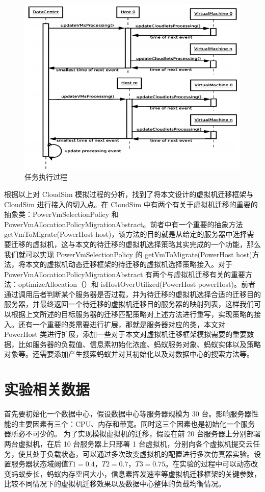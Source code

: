 \begin{figure}[htb]
  \centering
  \includegraphics{./Figure/IMG_Chap4_3.png}
  \caption{任务执行过程}\label{Fig:chap4_3}
\end{figure}

根据以上对 CloudSim 模拟过程的分析，找到了将本文设计的虚拟机迁移框架与 CloudSim 进行接入的切入点。在 CloudSim 中有两个有关于虚拟机迁移的重要的抽象类：PowerVmSelectionPolicy 和 PowerVmAllocationPolicyMigrationAbstract。前者中有一个重要的抽象方法 getVmToMigrate(PowerHost host)，该方法的目的就是从给定的服务器中选择需要迁移的虚拟机，这与本文的待迁移的虚拟机选择策略其实完成的一个功能，那么我们就可以实现 PowerVmSelectionPolicy 的 getVmToMigrate(PowerHost host)方法，将本文的虚拟机动态迁移框架的待迁移的虚拟机选择策略接入。对于 PowerVmAllocationPolicyMigrationAbstract 有两个与虚拟机迁移有关的重要方法：optimizeAllocation（）和 isHostOverUtilized(PowerHost powerHost)。前者通过调用后者判断某个服务器是否过载，并为待迁移的虚拟机选择合适的迁移目的服务器，并最终返回一个待迁移的虚拟机迁移目的服务器的映射列表，这样我们可以根据上文所述的目标服务器的迁移匹配策略对上述方法进行重写，实现策略的接入。还有一个重要的类需要进行扩展，那就是服务器对应的类，本文对 PowerHost 类进行扩展，添加一些对于本文对虚拟机迁移框架模拟需要的重要数据，比如服务器的负载值、信息素初始化浓度、蚂蚁服务对象、蚂蚁实体以及策略对象等。还需要添加产生搜索蚂蚁并对其初始化以及对数据中心的搜索方法等。

 \section{实验相关数据}
首先要初始化一个数据中心，假设数据中心等服务器规模为 30 台。影响服务器性能的主要因素有三个：CPU、内存和带宽。同时这三个因素也是初始化一个服务器所必不可少的。
为了实现模拟虚拟机的迁移，假设在前 20 台服务器上分别部署两台虚拟机，在后 10 台服务器上只部署 1 台虚拟机，分别向各个虚拟机提交云任务，使其处于负载状态，可以通过多次改变虚拟机的配置进行多次仿真器实验。设置服务器状态域阙值$ T1 = 0.4 $，$ T2 = 0.7 $，$ T3 = 0.75 $。在实验的过程中可以动态改变蚂蚁步长，蚂蚁内存空间大小，信息素挥发速率等虚拟机迁移框架的关键参数，比较不同情况下的虚拟机迁移效果以及数据中心整体的负载均衡情况。

